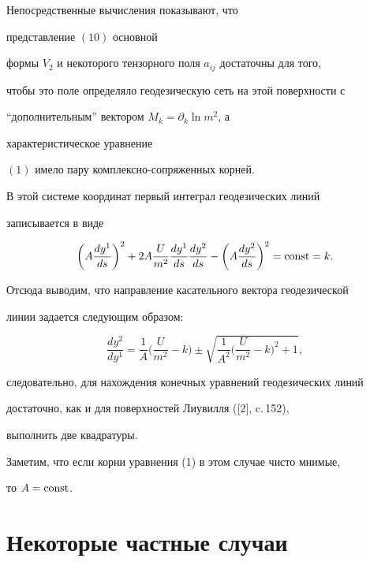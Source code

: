  


Непосредственные вычисления показывают, что {\it 


представление $(10)$ основной 


формы $V_2$ и некоторого тензорного поля $a_{ij}$ достаточны для того,  


чтобы это поле определяло геодезическую сеть на этой поверхности с 


``дополнительным'' вектором $M_k=\partial_k\ln m^2$, а 


характеристическое уравнение  


$(1)$ имело пару комплексно-сопряженных корней. 


} 


 


В этой системе координат первый интеграл геодезических линий 


записывается в виде 


$$ 


\bigg(A\frac{dy^1}{ds}\bigg)^2+2A\frac{U}{m^2} 


\frac{dy^1}{ds}\frac{dy^2}{ds}-\bigg(A\frac{dy^2}{ds} 


\bigg)^2=\const=k. 


$$ 


Отсюда выводим, что направление касательного вектора геодезической  


линии задается следующим образом: 


$$ 


\frac{dy^2}{dy^1}=\frac{1}{A}\bigg(\frac{U}{m^2}-k\bigg)\pm 


\sqrt{\displaystyle\frac{1}{A^2}\bigg(\frac{U}{m^2}-k\bigg)^2+1}, 


$$ 


следовательно, для нахождения конечных уравнений геодезических линий  


достаточно, как и для поверхностей Лиувилля ([2], c.\,152),


выполнить две квадратуры. 


 


Заметим, что если корни уравнения (1) в этом случае чисто мнимые,  


то $A=\operatorname{const}$. 


 


\section{Некоторые частные случаи} 


